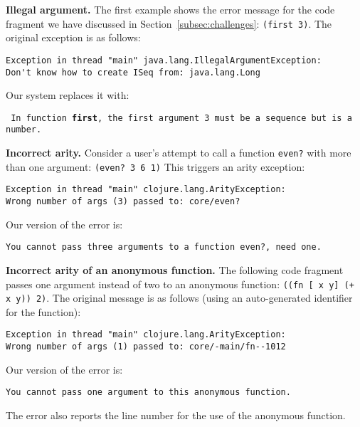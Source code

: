 \documentclass[submission,copyright,creativecommons]{eptcs}
\newcommand{\allcomments}[1]{{#1}}
\newcommand{\emcomment}[1]{{\bf \textcolor{ForestGreen}{\allcomments{{#1}}}}}
\begin{document}

{\bf Illegal argument. }
The first example shows the error message for the code fragment we have discussed in Section~\ref{subsec:challenges}:  {\tt (first 3)}. 
The original exception is as follows: 

\begin{verbatim}
Exception in thread "main" java.lang.IllegalArgumentException:
Don't know how to create ISeq from: java.lang.Long
\end{verbatim}

\noindent
Our system replaces it with:

\noindent
{\tt
In function {\bf first}, the first argument 3 must be a sequence but is a number.
}


{\bf Incorrect arity.}
Consider a user's attempt to call a function {\tt even?} with more than one argument: {\tt (even? 3 6 1)}
This triggers an arity exception:
\begin{verbatim}
Exception in thread "main" clojure.lang.ArityException:
Wrong number of args (3) passed to: core/even?
\end{verbatim}
Our version of the error is:
\begin{verbatim}
You cannot pass three arguments to a function even?, need one.
\end{verbatim}

{\bf Incorrect arity of an anonymous function.} The following code fragment passes one argument instead of two to an anonymous function:
{\tt ((fn [ x y] (+ x y)) 2)}. The original message is as follows (using an auto-generated identifier for the function): 
\begin{verbatim}
Exception in thread "main" clojure.lang.ArityException:
Wrong number of args (1) passed to: core/-main/fn--1012
\end{verbatim}
Our version of the error is:
\begin{verbatim}
You cannot pass one argument to this anonymous function.
\end{verbatim}
The error also reports the line number for the use of the anonymous function. 
\end{document}
